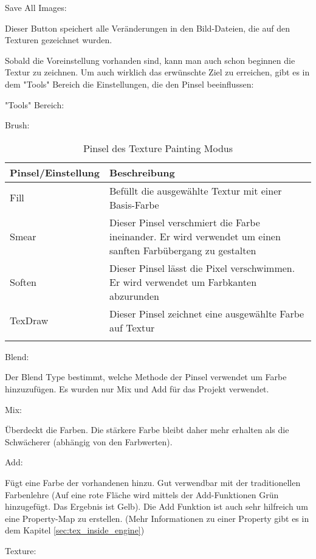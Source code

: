     Save All Images:

    Dieser Button speichert alle Veränderungen in den Bild-Dateien, die auf den Texturen
    gezeichnet wurden.


Sobald die Voreinstellung vorhanden sind, kann man auch schon beginnen die Textur zu zeichnen. Um auch wirklich das
erwünschte Ziel zu erreichen, gibt es in dem "Tools" Bereich die Einstellungen, die den Pinsel beeinflussen:


"Tools" Bereich:

    Brush:
    \begin{longtable}{|p{4cm}|p{9.6cm}|}
        \hline
        \endfirsthead
        \textbf{Pinsel/Einstellung} & \textbf{Beschreibung} \\
        \hline
        \endhead

        Fill & Befüllt die ausgewählte Textur mit einer Basis-Farbe \\
        Smear & Dieser Pinsel verschmiert die Farbe ineinander. Er wird verwendet um einen sanften Farbübergang zu gestalten \\
        Soften & Dieser Pinsel lässt die Pixel verschwimmen. Er wird verwendet um Farbkanten abzurunden \\
        TexDraw & Dieser Pinsel zeichnet eine ausgewählte Farbe auf Textur \\
        \hline
        \caption{Pinsel des Texture Painting Modus}
        \label{table:tex_painting_brushes}
    \end{longtable}

    Blend:

    Der Blend Type bestimmt, welche Methode der Pinsel verwendet um Farbe hinzuzufügen. Es wurden nur Mix und Add für
    das Projekt verwendet.

        Mix:

        Überdeckt die Farben. Die stärkere Farbe bleibt daher mehr erhalten als die Schwächerer
        (abhängig von den Farbwerten).

        Add:

        Fügt eine Farbe der vorhandenen hinzu. Gut verwendbar mit der traditionellen Farbenlehre (Auf eine rote Fläche
        wird mittels der Add-Funktionen Grün hinzugefügt. Das Ergebnis ist Gelb).
        Die Add Funktion ist auch sehr hilfreich um eine Property-Map zu erstellen.
        (Mehr Informationen zu einer Property gibt es in dem Kapitel \ref{sec:tex_inside_engine})



    Texture:


